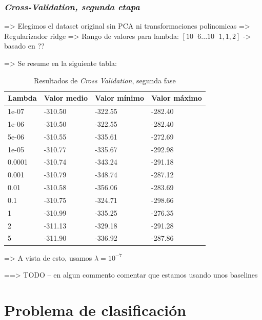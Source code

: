 \documentclass[11pt]{article}
\begin{document}
\subsubsection{\emph{Cross-Validation, segunda etapa}}

=> Elegimos el dataset original sin PCA ni transformaciones polinomicas
=> Regularizador ridge
=> Rango de valores para lambda: $[10^-6 ... 10^-1, 1, 2]$ -> basado en ??

=> Se resume en la siguiente tabla:

\begin{table}[H]
\begin{tabularx}{\textwidth}{|X|X|X|X|}
    \hline
    \textbf{Lambda} & \textbf{Valor medio} & \textbf{Valor mínimo} & \textbf{Valor máximo} \\
    \hline
    1e-07 & -310.50 &  -322.55 & -282.40 \\
    1e-06 & -310.50 &  -322.55 & -282.40 \\
    5e-06 & -310.55 &  -335.61 & -272.69 \\
    1e-05 & -310.77 &  -335.67 & -292.98 \\
    0.0001 & -310.74 &  -343.24 & -291.18 \\
    0.001 & -310.79 &  -348.74 & -287.12 \\
    0.01 & -310.58 &  -356.06 & -283.69 \\
    0.1 & -310.75 &  -324.71 & -298.66 \\
    1 & -310.99 &  -335.25 & -276.35 \\
    2 & -311.13 &  -329.18 & -291.28 \\
    5 & -311.90 &  -336.92 & -287.86 \\
    \hline
\end{tabularx}
    \caption{Resultados de \emph{Cross Validation}, segunda fase}
\end{table}

=> A vista de esto, usamos $\lambda = 10^{-7}$


==> TODO -- en algun commento comentar que estamos usando unos baselines
\pagebreak
\section{Problema de clasificación}

\pagebreak



\end{document}
